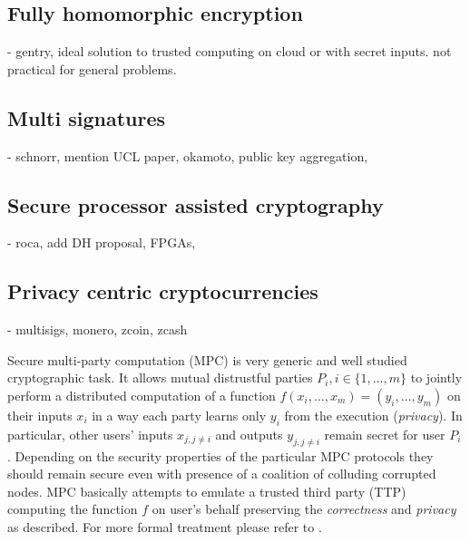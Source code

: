 \documentclass[
  digital, %
  twoside, %
  table,   %
  lof,     %
  lot,     %
]{fithesis3}
\begin{document}
\begin{ecmmnt}
    \subsection{Fully homomorphic encryption}
    - gentry, ideal solution to trusted computing on cloud or with secret inputs. not practical for general problems.
    
    \subsection{Multi signatures}
    - schnorr, mention UCL paper, okamoto, public key aggregation,  
    
    \subsection{Secure processor assisted cryptography}
    - roca, add DH proposal, FPGAs, 
    
    \subsection{Privacy centric cryptocurrencies}
    - multisigs, monero, zcoin, zcash
\end{ecmmnt}

\newpage

Secure multi-party computation (MPC) is very generic and well studied cryptographic task.
It allows mutual distrustful parties $P_i, i \in \{1,\dots,m\}$ to jointly perform a distributed computation of a function $f(x_i,\dots,x_m) = (y_i,\dots,y_m)$ on their inputs $x_i$ in a way each party learns only $y_i$ from the execution (\emph{privacy}). In particular, other users' inputs $x_{j, j \neq i}$ and outputs $y_{j, j \neq i}$ remain secret for user $P_i$. Depending on the security properties of the particular MPC protocols they should remain secure even with presence of a coalition of colluding corrupted nodes. MPC basically attempts to emulate a trusted third party (TTP) computing the function $f$ on user's behalf preserving the \emph{correctness} and \emph{privacy} as described. For more formal treatment please refer to \cite{G09}.
\end{document}
